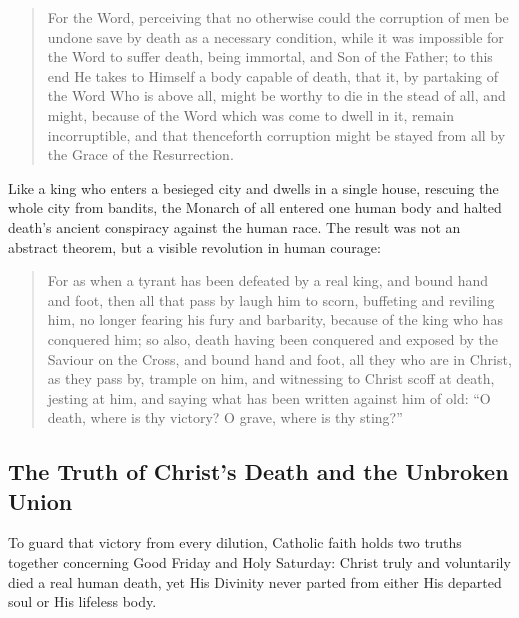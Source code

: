 \begin{quote}
For the Word, perceiving that no otherwise could the corruption of men be undone save by death as a necessary condition, while it was impossible for the Word to suffer death, being immortal, and Son of the Father; to this end He takes to Himself a body capable of death, that it, by partaking of the Word Who is above all, might be worthy to die in the stead of all, and might, because of the Word which was come to dwell in it, remain incorruptible, and that thenceforth corruption might be stayed from all by the Grace of the Resurrection.
\end{quote}

Like a king who enters a besieged city and dwells in a single house, rescuing the whole city from bandits, the Monarch of all entered one human body and halted death's ancient conspiracy against the human race. The result was not an abstract theorem, but a visible revolution in human courage:

\begin{quote}
For as when a tyrant has been defeated by a real king, and bound hand and foot, then all that pass by laugh him to scorn, buffeting and reviling him, no longer fearing his fury and barbarity, because of the king who has conquered him; so also, death having been conquered and exposed by the Saviour on the Cross, and bound hand and foot, all they who are in Christ, as they pass by, trample on him, and witnessing to Christ scoff at death, jesting at him, and saying what has been written against him of old: ``O death, where is thy victory? O grave, where is thy sting?''
\end{quote}

\subsection{The Truth of Christ's Death and the Unbroken Union}

To guard that victory from every dilution, Catholic faith holds two truths together concerning Good Friday and Holy Saturday: Christ truly and voluntarily died a real human death, yet His Divinity never parted from either His departed soul or His lifeless body.

